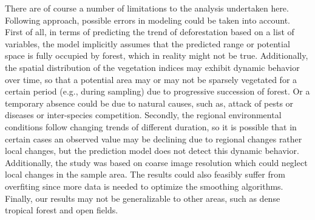 There are of course a number of limitations to the analysis undertaken here. Following \citet{murase_2009} approach, possible errors in modeling could be taken into account. First of all, in terms of predicting the trend of deforestation based on a list of variables, the model implicitly assumes that the predicted range or potential space is fully occupied by forest, which in reality might not be true.  Additionally, the spatial distribution of the vegetation indices may exhibit dynamic behavior over time, so that a potential area may or may not be sparsely vegetated for a certain period (e.g., during sampling) due to progressive succession of forest. Or a temporary absence could be due to natural causes, such as, attack of pests or diseases or inter-species competition. Secondly, the regional environmental conditions follow changing trends of different duration, so it is possible that in certain cases an observed value may be declining due to regional changes rather local changes, but the prediction model does not detect this dynamic behavior. Additionally, the study was based on coarse image resolution which could neglect local changes in the sample area. The results could also feasibly suffer from overfiting since more data is needed to optimize the smoothing algorithms. Finally, our results may not  be generalizable  to  other areas, such as dense tropical forest and open fields.


\let\cleardoublepage\clearpage
\begin{appendices} \label{appendix}
\renewcommand{\thechapter}{A.\arabic{chapter}}

\end{appendices}

